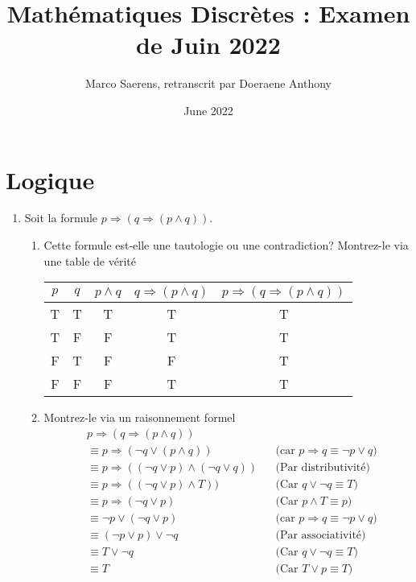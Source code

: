 \documentclass[A4paper,11pt]{article}
\title{Mathématiques Discrètes : Examen de Juin 2022}
\author{Marco Saerens, retranscrit par Doeraene Anthony}
\date{June 2022}
\begin{document}
\maketitle

\section{Logique}
\begin{enumerate}
    \item Soit la formule $p\Rightarrow (q\Rightarrow (p\land q))$. 
    \begin{enumerate}
        \item Cette formule est-elle une tautologie ou une contradiction? Montrez-le via une table de vérité
        
        \begin{center}
            \begin{tabular}{cc|ccc}
             $p$ & $q$ & $p \land q$ & $q\Rightarrow (p\land q)$ & $p\Rightarrow (q\Rightarrow (p\land q))$ \\\hline
              T & T & T & T & T\\
              T & F & F & T & T\\
              F & T & F & F & T\\
              F & F & F & T & T
        \end{tabular}
        \end{center}

        \item Montrez-le via un raisonnement formel
        \begin{align*}
        &p\Rightarrow (q\Rightarrow (p\land q))\\
        &\equiv p\Rightarrow(\neg q \lor(p\land q)) &&\text{(car } p \Rightarrow q \equiv \neg p \lor q)\\
        &\equiv p\Rightarrow((\neg q \lor p) \land (\neg q \lor q)) && \text{(Par distributivité)}\\
        &\equiv p\Rightarrow((\neg q \lor p) \land T)) && \text{(Car } q \lor \neg q \equiv T)\\
        &\equiv p\Rightarrow(\neg q \lor p) && \text{(Car } p \land T \equiv p)\\
        &\equiv \neg p \lor (\neg q \lor p) &&\text{(car } p \Rightarrow q \equiv \neg p \lor q)\\
        &\equiv (\neg p \lor p) \lor \neg q && \text{(Par associativité)}\\
        &\equiv T \lor \neg q && \text{(Car } q \lor \neg q \equiv T)\\
        &\equiv T && \text{(Car } T \lor p \equiv T)
        \end{align*}
    \end{enumerate}
    

\end{enumerate}
\end{document}

